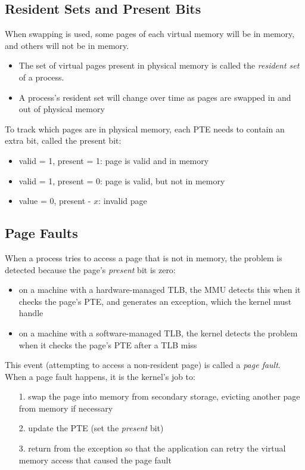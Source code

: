 \documentclass[12pt]{article}
\theoremstyle{plain}
\theoremstyle{definition}
\begin{document}
\subsection{Resident Sets and Present Bits}
When swapping is used, some pages of each virtual memory will be in memory, and others will not be in memory.
\begin{itemize}
  \item The set of virtual pages present in physical memory is called the \emph{resident set} of a process.
  \item A process's resident set will change over time as pages are swapped in and out of physical memory
\end{itemize}

To track which pages are in physical memory, each PTE needs to contain an extra bit, called the present bit:
\begin{itemize}
  \item valid = 1, present = 1: page is valid and in memory
  \item valid = 1, present = 0: page is valid, but not in memory
  \item value = 0, present - $x$: invalid page
\end{itemize}

\subsection{Page Faults}
When a process tries to access a page that is not in memory, the problem is detected because the page's \emph{present} bit is zero:
\begin{itemize}
  \item on a machine with a hardware-managed TLB, the MMU detects this when it checks the page's PTE, and generates an exception, which the kernel must handle
  \item on a machine with a software-managed TLB, the kernel detects the problem when it checks the page's PTE after a TLB miss
\end{itemize}

This event (attempting to access a non-resident page) is called a \emph{page fault}. \\

When a page fault happens, it is the kernel's job to:
\begin{enumerate}
  \item[1.] swap the page into memory from secondary storage, evicting another page from memory if necessary
  \item[2.] update the PTE (set the \emph{present} bit)
  \item[3.] return from the exception so that the application can retry the virtual memory access that caused the page fault
\end{enumerate}
\end{document}
